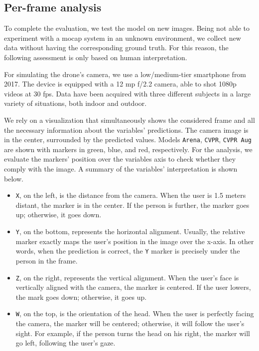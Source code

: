 


\subsection{Per-frame analysis}
\label{subsec:ql-interactive}

To complete the evaluation, we test the model on new images. Being not able to experiment with a \gls{mocap} system in an unknown environment, we collect new data without having the corresponding ground truth. For this reason, the following assessment is only based on human interpretation.

For simulating the drone's camera, we use a low/medium-tier smartphone from 2017. The device is equipped with a 12 \gls{mp} f/2.2 camera, able to shot 1080p videos at 30 \gls{fps}. Data have been acquired with three different subjects in a large variety of situations, both indoor and outdoor.

We rely on a visualization that simultaneously shows the considered frame and all the necessary information about the variables' predictions. The camera image is in the center, surrounded by the predicted values. Models \texttt{Arena}, \texttt{CVPR}, \texttt{CVPR Aug} are shown with markers in green, blue, and red, respectively. For the analysis, we evaluate the markers' position over the variables axis to check whether they comply with the image. A summary of the variables' interpretation is shown below.

\begin{itemize}
    \item \texttt{X}, on the left, is the distance from the camera. When the user is 1.5 meters distant, the marker is in the center. If the person is further, the marker goes up; otherwise, it goes down.
    \item \texttt{Y}, on the bottom, represents the horizontal alignment. Usually, the relative marker exactly maps the user's position in the image over the x-axis. In other words, when the prediction is correct, the \texttt{Y} marker is precisely under the person in the frame.
    \item \texttt{Z}, on the right, represents the vertical alignment. When the user's face is vertically aligned with the camera, the marker is centered.
    If the user lowers, the mark goes down; otherwise, it goes up.
    \item \texttt{W}, on the top, is the orientation of the head. When the user is perfectly facing the camera, the marker will be centered; otherwise, it will follow the user's sight. For example, if the person turns the head on his right, the marker will go left, following the user's gaze.
\end{itemize}

